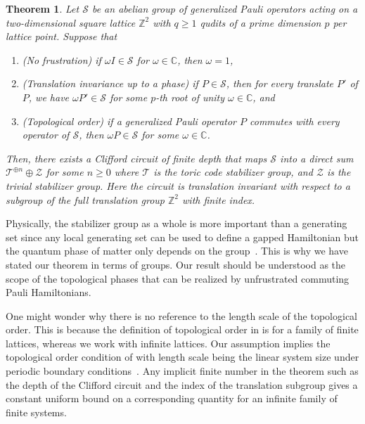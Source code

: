 \documentclass[aps,pra,
floatfix,notitlepage,
nofootinbib,
longbibliography,11pt]{revtex4-1}
\newtheorem{theorem}[lemma]{Theorem}
\theoremstyle{definition}
\newcommand{\CC}{{\mathbb{C}}}
\newcommand{\ZZ}{{\mathbb{Z}}}
\newcommand{\stab}{\mathcal{S}}
\begin{document}
\begin{theorem}\label{thm:main}
Let $\stab$ be an abelian group of generalized Pauli operators acting on a two-dimensional square lattice $\ZZ^2$
with $q \ge 1$ qudits of a prime dimension $p$ per lattice point. Suppose that
\begin{enumerate}
\item (No frustration) if $\omega I \in \stab$ for $\omega \in \CC$, then $\omega = 1$,
\item (Translation invariance up to a phase) if $P \in \stab$, then for every translate $P'$ of $P$, 
we have $\omega P' \in \stab$ for some $p$-th root of unity $\omega \in \CC$, and
\item (Topological order) if a generalized Pauli operator $P$ commutes with every operator of $\stab$, then $\omega P \in \stab$ for some $\omega \in \CC$.
\end{enumerate}
Then, there exists a Clifford circuit of finite depth that maps $\stab$ into
a direct sum $\mathcal T^{\oplus n} \oplus \mathcal Z$ for some $n \ge 0$
where $\mathcal T$ is the toric code stabilizer group,
and $\mathcal Z$ is the trivial stabilizer group.
Here the circuit is translation invariant
with respect to a subgroup of the full translation group $\ZZ^2$ with finite index.
\end{theorem}

Physically, the stabilizer group as a whole is more important than a generating set
since any local generating set can be used to define a gapped Hamiltonian
but the quantum phase of matter only depends on the group~\cite[\S 2]{Haah2013}.
This is why we have stated our theorem in terms of groups.
Our result should be understood as the scope of the topological phases
that can be realized by unfrustrated commuting Pauli Hamiltonians.


One might wonder why there is no reference to the length scale of the topological order.
This is because the definition of topological order in \cite{BravyiHastingsMichalakis2010stability}
is for a family of finite lattices,
whereas we work with infinite lattices.
Our assumption implies the topological order condition of \cite{BravyiHastingsMichalakis2010stability}
with length scale being the linear system size 
under periodic boundary conditions~\cite{Haah2013}.
Any implicit finite number in the theorem such as the depth of the Clifford circuit
and the index of the translation subgroup
gives a constant uniform bound on a corresponding quantity
for an infinite family of finite systems.
\end{document}
